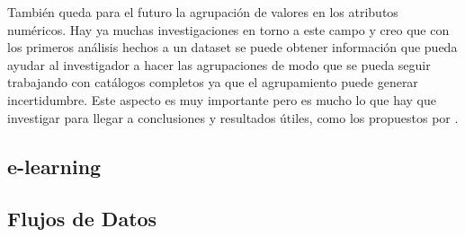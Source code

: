 También queda para el futuro la agrupación de valores en los atributos numéricos. Hay ya muchas investigaciones en torno a este campo y creo que con los primeros análisis hechos a un dataset se puede obtener información que pueda ayudar al investigador a hacer las agrupaciones de modo que se pueda seguir trabajando con catálogos completos ya que el agrupamiento puede generar incertidumbre. Este aspecto es muy importante pero es mucho lo que hay que investigar para llegar a conclusiones y resultados útiles, como los propuestos por \citet{DeshpandeKarypis-UsingConjunctionofAttributeValuesforClassification-2002}.




\subsection{e-learning}
\label{sec:clasificacion:e-learning}





\subsection{Flujos de Datos}
\label{sec:clasificacion:flujos-de-datos}

